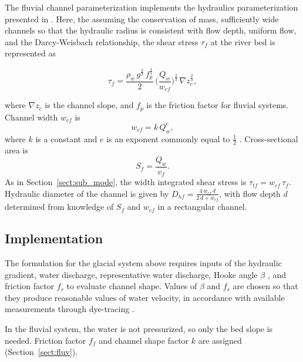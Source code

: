 \documentclass[11pt]{article}
\begin{document}
\begin{spacing}{1}
  The fluvial channel parameterization implements the hydraulics parameterization presented in \citet{tucker1997}.
  Here, the assuming the conservation of mass, sufficiently wide channels so that the hydraulic radius is consistent with flow depth, uniform flow, and the Darcy-Weisbach relationship,
  the shear stress $\tau_f$ at the river bed is represented as
  \begin{linenomath*}
    \begin{equation}
      \label{eq:DW_tau}
      \tau_f=\frac{\rho_w\,g^{\frac{2}{3}}\,f_p^{\frac{1}{3}}}{2}\, \Big(\frac{Q_w}{w_{cf}} \Big)^{\frac{2}{3}} \,\nabla z_{c}^{\frac{2}{3}},
    \end{equation}
  \end{linenomath*}
  where $\nabla z_{c}$ is the channel slope, and $f_p$ is the friction factor for fluvial systems.
  Channel width $w_{cf}$ is 
  \begin{equation}
    \label{eq:wcf}
    w_{cf} = k \, Q_w^e,
  \end{equation}
  where $k$ is a constant and $e$ is an exponent commonly equal to $\frac{1}{2}$ \citep{leopold1953}. Cross-sectional area is 
  \begin{equation}
    \label{eq:Sf}
    S_f= \frac{Q_w}{v_f}.
  \end{equation}
  As in Section~\ref{sect:sub_mode}, the width integrated shear stress is $\tau_{tf}=w_{cf}\,\tau_f$.
  Hydraulic diameter of the channel is given by $D_{hf} = \frac{4\,w_{cf}\,d}{2\,d+w_{cf}}$, with flow depth $d$ determined from knowledge of $S_f$ and $w_{cf}$ in a rectangular channel.
  
  \subsection{Implementation}

  The formulation for the glacial system above requires inputs of the hydraulic gradient, water discharge, representative water discharge, Hooke angle $\beta$ \citep{hooke1990}, and friction factor $f_r$ to evaluate channel shape.
  Values of $\beta$ and $f_r$ are chosen so that they produce reasonable values of water velocity, in accordance with available measurements through dye-tracing \citep[Section~\ref{sect:sub_mode}, Figure~\ref{fig:model_outs}; e.g.][]{werder2010}.
  
  In the fluvial system, the water is not pressurized, so only the bed slope is needed. Friction factor $f_f$ and channel shape factor $k$ are assigned (Section~\ref{sect:fluv}).


\end{spacing}
\end{document}

